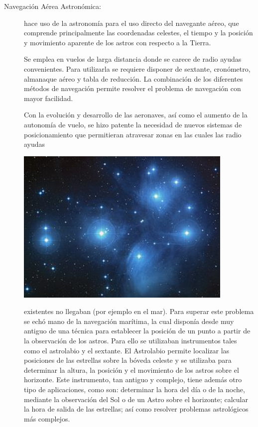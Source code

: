 \documentclass[a4paper,12pt,twoside]{article}
\begin{document}
\begin{description}


\item[Navegaci\'on A\'erea Astron\'omica:] hace uso de la astronom\'ia para el uso directo del navegante a\'ereo, que comprende principalmente las coordenadas celestes, el tiempo y la posici\'on y movimiento aparente de los astros con respecto a la Tierra.

  \begin{minipage}[b]{0.60\linewidth}
    Se emplea en vuelos de larga distancia donde se carece de radio
    ayudas convenientes. Para utilizarla se requiere disponer de
    sextante, cron\'ometro, almanaque a\'ereo y tabla de
    reducci\'on. La combinaci\'on de los diferentes m\'etodos de
    navegaci\'on permite resolver el problema de navegaci\'on con
    mayor facilidad.

Con la evoluci\'on y desarrollo de las aeronaves, as\'i como el aumento de la autonom\'ia de vuelo, se hizo patente la necesidad de nuevos sistemas de posicionamiento que permitieran atravesar  zonas en las cuales las radio ayudas
  \end{minipage}
  \begin{minipage}[b]{0.40\linewidth} \centering
    \includegraphics[width=0.85\textwidth]{Imagenes/pleyades}
  \end{minipage}
 existentes no llegaban (por ejemplo en el mar). Para superar este problema se ech\'o mano de la navegaci\'on mar\'itima, la cual dispon\'ia desde muy antiguo de una t\'ecnica para establecer la posici\'on de un punto a partir de la observaci\'on de los astros. Para ello se utilizaban instrumentos tales como el astrolabio y el sextante. El Astrolabio permite localizar las posiciones de las estrellas sobre la b\'oveda celeste y se utilizaba para determinar la altura, la posici\'on y el movimiento de los astros sobre el horizonte. Este instrumento, tan antiguo y complejo, tiene adem\'as otro tipo de aplicaciones, como son: determinar la hora del d\'ia o de la noche, mediante la observaci\'on del Sol o de un Astro sobre el horizonte; calcular la hora de salida de las estrellas; as\'i como resolver problemas astrol\'ogicos m\'as complejos. 


\end{description}
\end{document}
